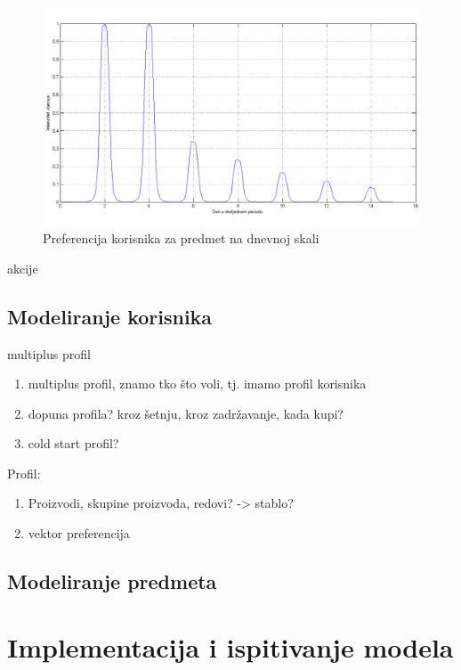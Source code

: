 \documentclass[times, utf8, diplomski, numeric]{fer}
\begin{document}
\begin{figure}[!htb]
	\centering
	\includegraphics[width=14.21cm]{images/prigusenocropped.png}
	\caption{Preferencija korisnika za predmet na dnevnoj skali}
	\label{fig:GaussPriguseno}
\end{figure}

akcije

\section{Modeliranje korisnika}
multiplus profil

\begin{enumerate}
  \item multiplus profil, znamo tko što voli, tj. imamo profil korisnika
  \item dopuna profila? kroz šetnju, kroz zadržavanje, kada kupi?
  \item cold start profil?
\end{enumerate}

Profil:
\begin{enumerate}
  \item Proizvodi, skupine proizvoda, redovi? -> stablo?
  \item vektor preferencija
\end{enumerate}

\section{Modeliranje predmeta}

\chapter{Implementacija i ispitivanje modela}
\end{document}
